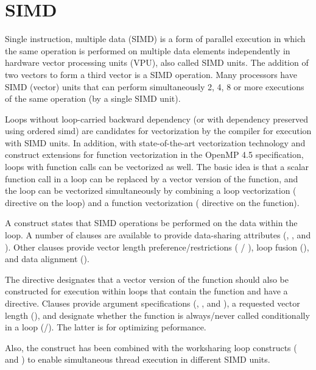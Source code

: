 \pagebreak
\chapter{SIMD}
\label{chap:simd}

Single instruction, multiple data (SIMD) is a form of parallel execution 
in which the same operation is performed on multiple data elements 
independently in hardware vector processing units (VPU), also called SIMD units.
The addition of two vectors to form a third vector is a SIMD operation.
Many processors have SIMD (vector) units that can perform simultaneously 
2, 4, 8 or more executions of the same operation (by a single SIMD unit). 

Loops without loop-carried backward dependency (or with dependency preserved using 
ordered simd) are candidates for vectorization by the compiler for 
execution with SIMD units. In addition, with state-of-the-art vectorization 
technology and  construct extensions for function vectorization
in the OpenMP 4.5 specification, loops with function calls can be vectorized as well. 
The basic idea is that a scalar function call in a loop can be replaced by a vector version 
of the function, and the loop can be vectorized simultaneously by combining a loop 
vectorization ( directive on the loop) and a function 
vectorization ( directive on the function).

A  construct states that SIMD operations be performed on the
data within the loop.  A number of clauses are available to provide
data-sharing attributes (, ,  and 
).  Other clauses provide vector length preference/restrictions 
( / ), loop fusion (), and data 
alignment ().

The  directive designates
that a vector version of the function should also be constructed for 
execution within loops that contain the function and have a  
directive.  Clauses provide argument specifications (,
, and ), a requested vector length 
(), and designate whether the function is always/never 
called conditionally in a loop (/). 
The latter is for optimizing peformance.

Also, the  construct has been combined with the worksharing loop 
constructs ( and ) to enable simultaneous thread 
execution in different SIMD units.  


